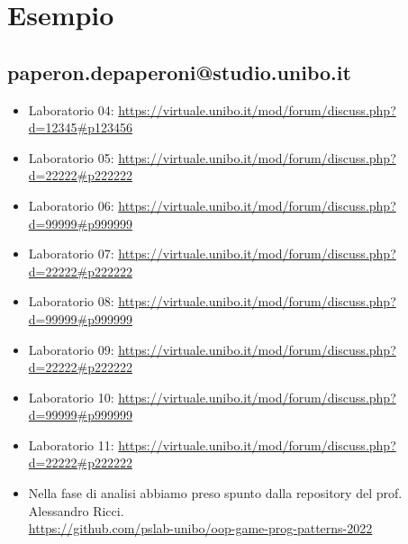\documentclass[a4paper,12pt]{report}
\begin{document}
\section*{Esempio}

\subsection{paperon.depaperoni@studio.unibo.it}

\begin{itemize}
    \item Laboratorio 04: \url{https://virtuale.unibo.it/mod/forum/discuss.php?d=12345#p123456}
    \item Laboratorio 05: \url{https://virtuale.unibo.it/mod/forum/discuss.php?d=22222#p222222}
    \item Laboratorio 06: \url{https://virtuale.unibo.it/mod/forum/discuss.php?d=99999#p999999}
    \item Laboratorio 07: \url{https://virtuale.unibo.it/mod/forum/discuss.php?d=22222#p222222}
    \item Laboratorio 08: \url{https://virtuale.unibo.it/mod/forum/discuss.php?d=99999#p999999}
    \item Laboratorio 09: \url{https://virtuale.unibo.it/mod/forum/discuss.php?d=22222#p222222}
    \item Laboratorio 10: \url{https://virtuale.unibo.it/mod/forum/discuss.php?d=99999#p999999}
    \item Laboratorio 11: \url{https://virtuale.unibo.it/mod/forum/discuss.php?d=22222#p222222}
\end{itemize}




\begin{itemize}
    \item Nella fase di analisi abbiamo preso spunto dalla repository del prof. Alessandro Ricci. 
    \\\url{https://github.com/pslab-unibo/oop-game-prog-patterns-2022} 
\end{itemize}
\end{document}
